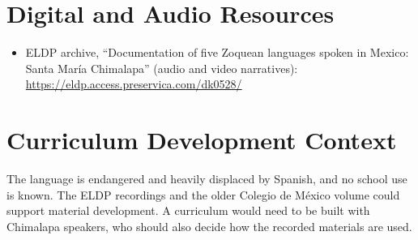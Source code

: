 \documentclass[12pt]{article}
\begin{document}
\section{Digital and Audio Resources}
\begin{itemize}
\item ELDP archive, ``Documentation of five Zoquean languages spoken in Mexico: Santa Mar\'ia Chimalapa'' (audio and video narratives): \url{https://eldp.access.preservica.com/dk0528/}
\end{itemize}

\section{Curriculum Development Context}
The language is endangered and heavily displaced by Spanish, and no school use is known. The ELDP recordings and the older Colegio de M\'exico volume could support material development. A curriculum would need to be built with Chimalapa speakers, who should also decide how the recorded materials are used.
\end{document}

